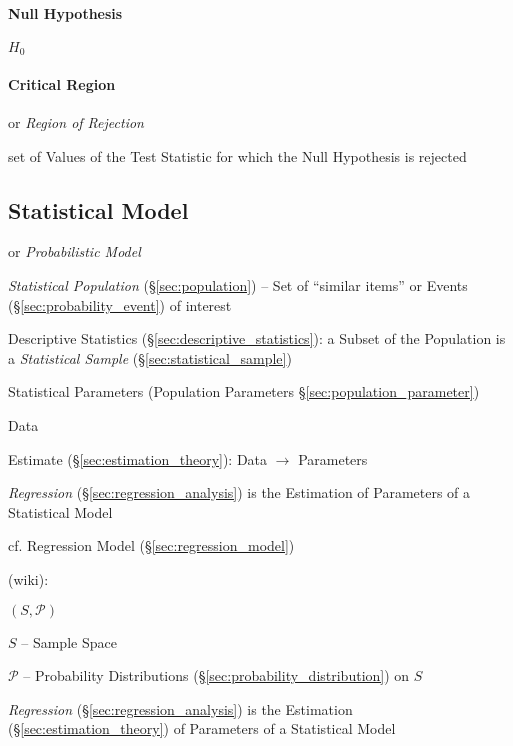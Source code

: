 \paragraph{Null Hypothesis}\label{sec:null_hypothesis}\hfill

$H_0$



\paragraph{Critical Region}\label{sec:critical_region}\hfill

or \emph{Region of Rejection}

set of Values of the Test Statistic for which the Null Hypothesis is rejected



\subsection{Statistical Model}\label{sec:statistical_model}

or \emph{Probabilistic Model}

\emph{Statistical Population} (\S\ref{sec:population}) -- Set of ``similar
items'' or Events (\S\ref{sec:probability_event}) of interest

\fist Descriptive Statistics (\S\ref{sec:descriptive_statistics}): a Subset of
the Population is a \emph{Statistical Sample} (\S\ref{sec:statistical_sample})

Statistical Parameters (Population Parameters \S\ref{sec:population_parameter})

Data

Estimate (\S\ref{sec:estimation_theory}): Data $\rightarrow$ Parameters

\emph{Regression} (\S\ref{sec:regression_analysis}) is the Estimation of
Parameters of a Statistical Model

cf. Regression Model (\S\ref{sec:regression_model})

(wiki):

$(S, \mathcal{P})$

$S$ -- Sample Space

$\mathcal{P}$ -- Probability Distributions
(\S\ref{sec:probability_distribution}) on $S$

\emph{Regression} (\S\ref{sec:regression_analysis}) is the Estimation
(\S\ref{sec:estimation_theory}) of Parameters of a Statistical Model

